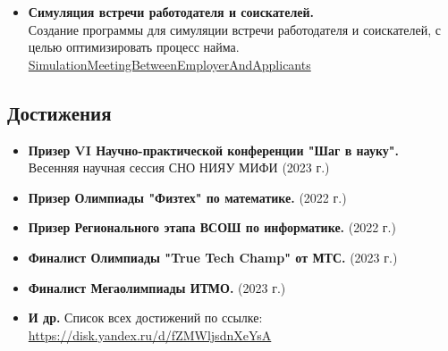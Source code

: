 \documentclass[14pt]{extarticle}
\begin{document}
\begin{minipage}{0.6\textwidth}
\begin{itemize}
            \item \textbf{Симуляция встречи работодателя и соискателей.} \\
                  Создание программы для симуляции встречи работодателя и соискателей, с целью оптимизировать процесс найма. \\
                  \href{https://github.com/MichaelKolesnikov/SimulationMeetingBetweenEmployerAndApplicants}{SimulationMeetingBetweenEmployerAndApplicants}
      \end{itemize}
      \subsection*{Достижения}
      \begin{itemize}
            \item \textbf{Призер VI Научно-практической конференции "Шаг в науку".} \\
                  Весенняя научная сессия СНО НИЯУ МИФИ (2023 г.)

            \item \textbf{Призер Олимпиады "Физтех" по математике.} (2022 г.)

            \item \textbf{Призер Регионального этапа ВСОШ по информатике.} (2022 г.)

            \item \textbf{Финалист Олимпиады "True Tech Champ" от МТС.} (2023 г.)

            \item \textbf{Финалист Мегаолимпиады ИТМО.} (2023 г.)

            \item \textbf{И др.} Список всех достижений по ссылке: \\
                  \href{https://disk.yandex.ru/d/fZMWljsdnXeYsA}{https://disk.yandex.ru/d/fZMWljsdnXeYsA}
      \end{itemize}
\end{minipage}
\end{document}
